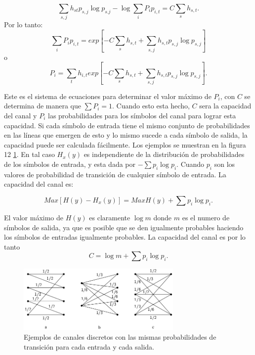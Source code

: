 \begin{equation}
  \sum_{s,j}h_{st} p_{s,j} \log{p_{s.j}} - \log{\sum_{i}P_i p_{i,t}} = C \sum_{s} h_{s,t}.
\end{equation}
Por lo tanto:
\begin{equation}
  \sum_{i} P_i p_{i,t} = exp[- C \sum_{s} h_{s,t}+ \sum_{s,j} h_{s,t} p_{s,j} \log{p_{s,j}}]
\end{equation}
o  
\begin{equation}
  P_i = \sum_{t} h_{i,t} exp[ - C \sum_{s} h_{s,t}+ \sum_{s,j} h_{s,t} p_{s,j} \log{p_{s,j}} ].
\end{equation}

Este es el sistema de ecuaciones para determinar el valor m\'aximo de $P_i$, con $C$ se determina de 
manera que $\sum P_i = 1$. Cuando esto esta hecho, $C$ sera la capacidad del canal y $P_i$ las probabilidades
para los s\'imbolos del canal para lograr esta capacidad.  
Si cada s\'imbolo de entrada tiene el mismo conjunto de probabilidades en las l\'ineas que emergen de esto y lo mismo 
sucede a cada s\'imbolo de salida, la capacidad puede ser calculada f\'acilmente. Los ejemplos se muestran en la figura 12 \ref{fig:12}.  
En tal caso $H_x (y)$ es independiente de la distribuci\'on de probabilidades de los s\'imbolos de entrada, y esta dada por 
$-\sum p_i \log{p_i}$. Cuando $p_i$ son los valores de probabilidad de transici\'on de cualquier s\'imbolo de entrada. La
capacidad del canal es:

\begin{equation}
  Max [H(y) - H_x(y)] = Max H(y) + \sum p_i \log{p_i}.
\end{equation}

El valor m\'aximo de $H(y)$ es claramente  $\log{m}$ donde $m$ es el numero de s\'imbolos de salida, ya que es posible que se den 
igualmente probables haciendo los s\'imbolos de entradas igualmente probables. La capacidad del canal es por lo tanto
\begin{equation}
  C = \log{m} + \sum p_i \log{p_i}.
\end{equation}

\begin{figure}[!ht]
\centerline{\includegraphics[width=80mm]{Imagenes/SinComentarios/Pagina27-Figura12.png}}
\caption{Ejemplos de canales discretos con las mismas probabilidades de
 transici\'{o}n para cada entrada y cada salida.}
\label{fig:12}
\end{figure}


